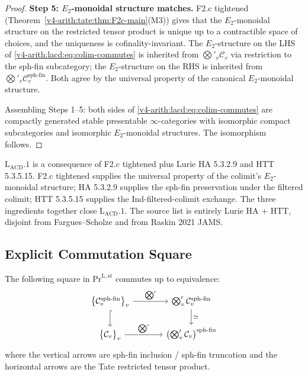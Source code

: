 \begin{proof}
\textbf{Step 5: \(E_{2}\)-monoidal structure matches.} F2.c tightened
(Theorem~\ref{v4-arith:tate:thm:F2c-main}(M3)) gives that the
\(E_{2}\)-monoidal structure on the restricted tensor product is
unique up to a contractible space of choices, and the uniqueness is
cofinality-invariant. The \(E_{2}\)-structure on the LHS of
\eqref{v4-arith:lacd:eq:colim-commutes} is inherited from
\(\bigotimes'_{v}\mathcal{C}_{v}\) via restriction to the sph-fin
subcategory; the \(E_{2}\)-structure on the RHS is inherited from
\(\bigotimes'_{v}\mathcal{C}_{v}^{\mathrm{sph\text{-}fin}}\). Both
agree by the universal property of the canonical
\(E_{2}\)-monoidal structure.

Assembling Steps 1--5: both sides of
\eqref{v4-arith:lacd:eq:colim-commutes} are compactly generated
stable presentable \(\infty\)-categories with isomorphic compact
subcategories and isomorphic \(E_{2}\)-monoidal structures. The
isomorphism follows.
\end{proof}

\begin{remark}
\label{v4-arith:lacd:rem:F2c-role}
\(\mathrm{L}_{\mathrm{ACD}}.1\) is a consequence of F2.c tightened plus
Lurie HA 5.3.2.9 and HTT 5.3.5.15. F2.c tightened supplies the
universal property of the colimit's \(E_{2}\)-monoidal structure;
HA 5.3.2.9 supplies the sph-fin preservation under the filtered
colimit; HTT 5.3.5.15 supplies the Ind-filtered-colimit exchange. The
three ingredients together close \(\mathrm{L}_{\mathrm{ACD}}.1\). The
source list is entirely Lurie HA + HTT, disjoint from
Fargues--Scholze and from Raskin 2021 JAMS.
\end{remark}

\subsection{Explicit Commutation Square}

\begin{corollary}
\label{v4-arith:lacd:cor:commutation-square}
The following square in
\(\mathrm{Pr}^{\mathrm{L,st}}\) commutes up to equivalence:
\begin{equation}
\begin{tikzcd}[column sep=large]
\bigl\{\mathcal{C}_{v}^{\mathrm{sph\text{-}fin}}\bigr\}_{v} \ar[r, "\bigotimes'"] \ar[d, hook] & \bigotimes'_{v}\mathcal{C}_{v}^{\mathrm{sph\text{-}fin}} \ar[d, "\simeq"] \\
\bigl\{\mathcal{C}_{v}\bigr\}_{v} \ar[r, "\bigotimes'"] & \bigl(\bigotimes'_{v}\mathcal{C}_{v}\bigr)^{\mathrm{sph\text{-}fin}}
\end{tikzcd}
\end{equation}
where the vertical arrows are sph-fin inclusion / sph-fin truncation
and the horizontal arrows are the Tate restricted tensor product.
\end{corollary}

